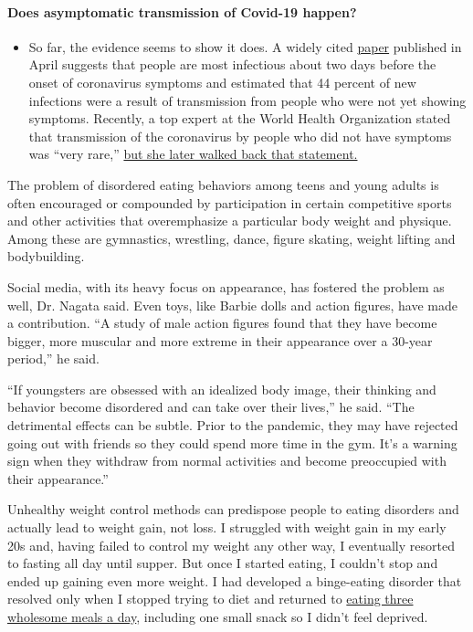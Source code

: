 \begin{itemize}
{  \paragraph{Does asymptomatic transmission of Covid-19
  happen?}\label{does-asymptomatic-transmission-of-covid-19-happen}}

  \begin{itemize}
  \tightlist
  \item
    So far, the evidence seems to show it does. A widely cited
    \href{https://www.nature.com/articles/s41591-020-0869-5}{paper}
    published in April suggests that people are most infectious about
    two days before the onset of coronavirus symptoms and estimated that
    44 percent of new infections were a result of transmission from
    people who were not yet showing symptoms. Recently, a top expert at
    the World Health Organization stated that transmission of the
    coronavirus by people who did not have symptoms was ``very rare,''
    \href{https://www.nytimes.com/2020/06/09/world/coronavirus-updates.html?action=click\&pgtype=Article\&state=default\&region=MAIN_CONTENT_3\&context=storylines_faq\#link-1f302e21}{but
    she later walked back that statement.}
  \end{itemize}
\end{itemize}

The problem of disordered eating behaviors among teens and young adults
is often encouraged or compounded by participation in certain
competitive sports and other activities that overemphasize a particular
body weight and physique. Among these are gymnastics, wrestling, dance,
figure skating, weight lifting and bodybuilding.

Social media, with its heavy focus on appearance, has fostered the
problem as well, Dr. Nagata said. Even toys, like Barbie dolls and
action figures, have made a contribution. ``A study of male action
figures found that they have become bigger, more muscular and more
extreme in their appearance over a 30-year period,'' he said.

``If youngsters are obsessed with an idealized body image, their
thinking and behavior become disordered and can take over their lives,''
he said. ``The detrimental effects can be subtle. Prior to the pandemic,
they may have rejected going out with friends so they could spend more
time in the gym. It's a warning sign when they withdraw from normal
activities and become preoccupied with their appearance.''

Unhealthy weight control methods can predispose people to eating
disorders and actually lead to weight gain, not loss. I struggled with
weight gain in my early 20s and, having failed to control my weight any
other way, I eventually resorted to fasting all day until supper. But
once I started eating, I couldn't stop and ended up gaining even more
weight. I had developed a binge-eating disorder that resolved only when
I stopped trying to diet and returned to
\href{https://www.nytimes.com/2018/03/05/well/jane-brodys-personal-secrets-to-lasting-weight-loss.html}{eating
three wholesome meals a day}, including one small snack so I didn't feel
deprived.

